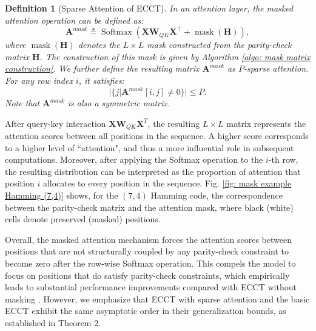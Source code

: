 \documentclass[lettersize,onecolumn]{IEEEtran}
\newtheorem{definition}{Definition}
\begin{document}
\begin{definition}[Sparse Attention of ECCT]\label{def: masked attention of ECCT}
    In an attention layer, the masked attention operation can be defined as:
    \begin{equation}
        \mathbf{A}^{mask}\triangleq\operatorname{Softmax}\left(\mathbf{X} \mathbf{W}_{QK} \mathbf{X}^{\top}+\operatorname{mask}(\mathbf{H})\right),
        \label{eq: masked attention}
    \end{equation}
    where $\operatorname{mask}(\mathbf{H})$ denotes the $L \times L$ mask constructed from the parity-check matrix $\mathbf{H}$. The construction of this mask is given by Algorithm \ref{algo: mask matrix construction}. We further define the resulting matrix $\mathbf{A}^{mask}$ as $P$-sparse attention. For any row index $i$, it satisfies:
    \begin{equation}
        |\{j|\mathbf{A}^{mask}[i,j]\neq 0\}|\leq P.
    \end{equation}
    Note that $\mathbf{A}^{mask}$ is also a symmetric matrix.
\end{definition}

After query-key interaction $\mathbf{X} \mathbf{W}_{QK} \mathbf{X}^{T}$, the resulting $L \times L$ matrix represents the attention scores between all positions in the sequence. A higher score corresponds to a higher level of ``attention", and thus a more influential role in subsequent computations. Moreover, after applying the Softmax operation to the $i$-th row, the resulting distribution can be interpreted as the proportion of attention that position $i$ allocates to every position in the sequence. Fig. \ref{fig: mask example Hamming (7,4)} shows, for the $(7,4)$ Hamming code, the correspondence between the parity-check matrix and the attention mask, where black (white) cells denote preserved (masked) positions.

Overall, the masked attention mechanism forces the attention scores between positions that are not structurally coupled by any parity-check constraint to become zero after the row-wise Softmax operation. This compels the model to focus on positions that do satisfy parity-check constraints, which empirically leads to substantial performance improvements compared with ECCT without masking \cite{choukroun2022ECCT}. However, we emphasize that ECCT with sparse attention and the basic ECCT exhibit the same asymptotic order in their generalization bounds, as established in Theorem 2.
\end{document}
